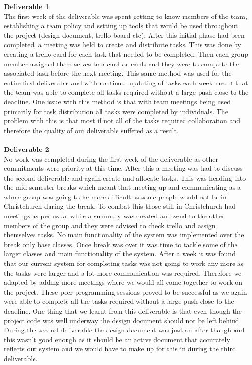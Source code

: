 \textbf{Deliverable 1:\\}
The first week of the deliverable was spent getting to know members of the team, establishing a team policy and setting up tools that would be used throughout the project (design document, trello board etc). After this initial phase had been completed, a meeting was held to create and distribute tasks. This was done by creating a trello card for each task that needed to be completed. Then each group member assigned them selves to a card or cards and they were to complete the associated task before the next meeting. This same method was used for the entire first deliverable and with continual updating of tasks each week meant that the team was able to complete all tasks required without a large push close to the deadline. One issue with this method is that with team meetings being used primarily for task distribution all tasks were completed by individuals. The problem with this is that most if not all of the tasks required collaboration and therefore the quality of our deliverable suffered as a result.\\
\\
\textbf{Deliverable 2:\\}
No work was completed during the first week of the deliverable as other commitments were priority at this time. After this a meeting was had to discuss the second deliverable and again create and allocate tasks. This was heading into the mid semester breaks which meant that meeting up and communicating as a whole group was going to be more difficult as some people would not be in Christchurch during the break. To combat this those still in Christchurch had meetings as per usual while a summary was created and send to the other members of the group and they were advised to check trello and assign themselves tasks. No main functionality of the system was implemented over the break only base classes. Once break was over it was time to tackle some of the larger classes and main functionality of the system. After a week it was found that our current system for completing tasks was not going to work any more as the tasks were larger and a lot more communication was required. Therefore we adapted by adding more meetings where we would all come together to work on the project. These peer programming sessions proved to be successful as we again were able to complete all the tasks required without a large push close to the deadline. One thing that we learnt from this deliverable is that even though the project code was well underway the design document should not be left behind. During the second deliverable the design document was just an after though and this wasn't good enough as it should be an active document that accurately reflects our system and we would have to make up for this in during the third deliverable.\\
